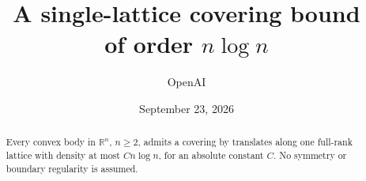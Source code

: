 \documentclass[11pt]{article}
\title{A single-lattice covering bound\\of order \texorpdfstring{$n\log n$}{n log n}}
\author{OpenAI}
\date{September 23, 2026}
\theoremstyle{definition}
\theoremstyle{remark}
\numberwithin{equation}{section}
\newcommand{\R}{\mathbb R}
\begin{document}
\maketitle
\begin{abstract}
Every convex body in $\R^n$, $n\ge2$, admits a covering by translates
along one full-rank lattice with density at most $Cn\log n$, for an absolute
constant $C$. No symmetry or boundary regularity is assumed.
\end{abstract}







\end{document}
